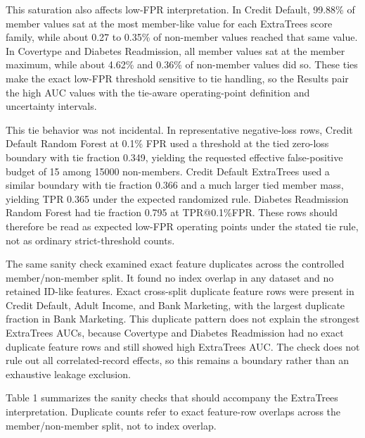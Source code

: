 \documentclass[
  10pt,
  twocolumn]{article}
\begin{document}
This saturation also affects low-FPR interpretation. In Credit Default, 99.88\% of member values sat at the most member-like value for each ExtraTrees score family, while about 0.27 to 0.35\% of non-member values reached that same value. In Covertype and Diabetes Readmission, all member values sat at the member maximum, while about 4.62\% and 0.36\% of non-member values did so. These ties make the exact low-FPR threshold sensitive to tie handling, so the Results pair the high AUC values with the tie-aware operating-point definition and uncertainty intervals.

This tie behavior was not incidental. In representative negative-loss rows, Credit Default Random Forest at 0.1\% FPR used a threshold at the tied zero-loss boundary with tie fraction 0.349, yielding the requested effective false-positive budget of 15 among 15000 non-members. Credit Default ExtraTrees used a similar boundary with tie fraction 0.366 and a much larger tied member mass, yielding TPR 0.365 under the expected randomized rule. Diabetes Readmission Random Forest had tie fraction 0.795 at TPR@0.1\%FPR. These rows should therefore be read as expected low-FPR operating points under the stated tie rule, not as ordinary strict-threshold counts.

The same sanity check examined exact feature duplicates across the controlled member/non-member split. It found no index overlap in any dataset and no retained ID-like features. Exact cross-split duplicate feature rows were present in Credit Default, Adult Income, and Bank Marketing, with the largest duplicate fraction in Bank Marketing. This duplicate pattern does not explain the strongest ExtraTrees AUCs, because Covertype and Diabetes Readmission had no exact duplicate feature rows and still showed high ExtraTrees AUC. The check does not rule out all correlated-record effects, so this remains a boundary rather than an exhaustive leakage exclusion.

Table 1 summarizes the sanity checks that should accompany the ExtraTrees interpretation. Duplicate counts refer to exact feature-row overlaps across the member/non-member split, not to index overlap.
\end{document}
